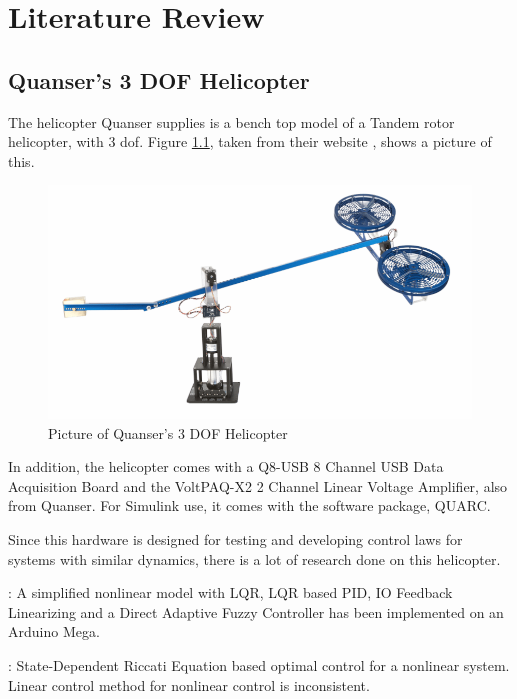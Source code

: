 \chapter{Literature Review}

\section{Quanser's 3 DOF Helicopter}

The helicopter Quanser supplies is a bench top model of a Tandem rotor helicopter, with 3 \acrfull{dof}. Figure \ref{fig:pic_heli}, taken from their website \cite{quanser_heli}, shows a picture of this. 

\begin{figure}[h!]
    \centering
    \includegraphics[scale=0.5]{fig/helicopter.png}
    \caption{Picture of Quanser's 3 DOF Helicopter}
    \label{fig:pic_heli}
\end{figure}

In addition, the helicopter comes with a Q8-USB 8 Channel USB Data Acquisition Board and the VoltPAQ-X2 2 Channel Linear Voltage Amplifier, also from Quanser. For Simulink use, it comes with the software package, QUARC.


Since this hardware is designed for testing and developing control laws for systems with similar dynamics, there is a lot of research done on this helicopter.

\cite{veeraboina_2018}: A simplified nonlinear model with LQR, LQR based PID, IO Feedback Linearizing and a Direct Adaptive Fuzzy Controller has been implemented on an Arduino Mega. 

\cite{arican_2018}: State-Dependent Riccati Equation based optimal control for a nonlinear system. Linear control method for nonlinear control is inconsistent. 

